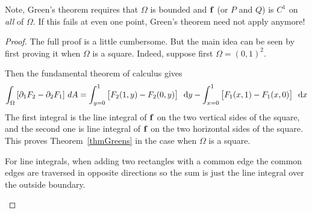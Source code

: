   \begin{remark}
    Note, Green's theorem requires that $\Omega$ is bounded and $\mathbf{ f}$ (or $P$ and $Q$) is $C^1$ on \emph{all} of $\Omega$.
    If this fails at even one point, Green's theorem need not apply anymore!
  \end{remark}



  
  \begin{proof}
    The full proof is a little cumbersome.     But the main idea can be seen by first proving it when $\Omega$ is a 
square.
    Indeed, suppose first $\Omega = (0, 1)^2$.
    \begin{center}
 

\end{center}
 
    Then the fundamental theorem of calculus gives
    \begin{equation*}
      \dint_\Omega \left[ \partial_1 F_2 - \partial_2 F_1 \right] \, dA
	= \dint_{y = 0}^1 \left[ F_2(1, y) - F_2(0, y) \right] \, \dy
	  - \dint_{x = 0}^1 \left[ F_1(x, 1) - F_1(x, 0) \right] \, \dx
    \end{equation*}
    The first integral is the line integral of $\mathbf{ f}$ on the two vertical sides of the square, and the second one is line integral of $\mathbf{ f}$ on the two horizontal sides of the square.
    This proves Theorem~\ref{thmGreens} in the case when $\Omega$ is a square.

 For line integrals, when adding two rectangles with a common edge the common 
edges are traversed in opposite directions so the sum is just the line integral
over the outside boundary. 
\begin{center}



\end{center}
\end{proof}
